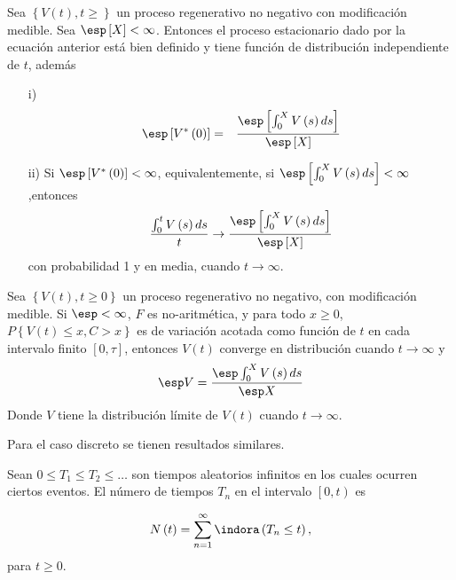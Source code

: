 \begin{Teo}
Sea $\left\{V\left(t\right),t\geq\right\}$ un proceso regenerativo no negativo con modificaci\'on medible. Sea $\esp\left[X\right]<\infty$. Entonces el proceso estacionario dado por la ecuaci\'on anterior est\'a bien definido y tiene funci\'on de distribuci\'on independiente de $t$, adem\'as
\begin{itemize}
\item[i)] \begin{eqnarray*}
\esp\left[V^{*}\left(0\right)\right]&=&\frac{\esp\left[\int_{0}^{X}V\left(s\right)ds\right]}{\esp\left[X\right]}\end{eqnarray*}
\item[ii)] Si $\esp\left[V^{*}\left(0\right)\right]<\infty$, equivalentemente, si $\esp\left[\int_{0}^{X}V\left(s\right)ds\right]<\infty$,entonces
\begin{eqnarray*}
\frac{\int_{0}^{t}V\left(s\right)ds}{t}\rightarrow\frac{\esp\left[\int_{0}^{X}V\left(s\right)ds\right]}{\esp\left[X\right]}
\end{eqnarray*}
con probabilidad 1 y en media, cuando $t\rightarrow\infty$.
\end{itemize}
\end{Teo}

\begin{Coro}
Sea $\left\{V\left(t\right),t\geq0\right\}$ un proceso regenerativo no negativo, con modificaci\'on medible. Si $\esp <\infty$, $F$ es no-aritm\'etica, y para todo $x\geq0$, $P\left\{V\left(t\right)\leq x,C>x\right\}$ es de variaci\'on acotada como funci\'on de $t$ en cada intervalo finito $\left[0,\tau\right]$, entonces $V\left(t\right)$ converge en distribuci\'on  cuando $t\rightarrow\infty$ y $$\esp V=\frac{\esp \int_{0}^{X}V\left(s\right)ds}{\esp X}$$
Donde $V$ tiene la distribuci\'on l\'imite de $V\left(t\right)$ cuando $t\rightarrow\infty$.

\end{Coro}

Para el caso discreto se tienen resultados similares.




\begin{Def}%
Sean $0\leq T_{1}\leq T_{2}\leq \ldots$ son tiempos aleatorios infinitos en los cuales ocurren ciertos eventos. El n\'umero de tiempos $T_{n}$ en el intervalo $\left[0,t\right)$ es

\begin{eqnarray}
N\left(t\right)=\sum_{n=1}^{\infty}\indora\left(T_{n}\leq t\right),
\end{eqnarray}
para $t\geq0$.
\end{Def}


